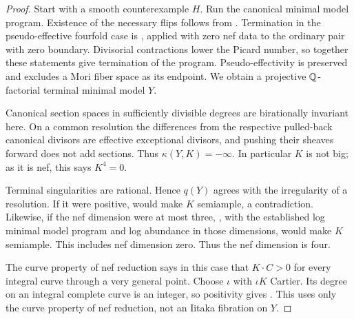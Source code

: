 \begin{proof}
Start with a smooth counterexample $H$.  Run the canonical minimal
model program.  Existence of the necessary flips follows from
\cite[Corollary~1.4.1]{BCHM2010}.  Termination in the pseudo-effective fourfold case is
\cite[Theorem~1.1]{ChenTsakanikas2023}, applied with zero nef data to
the ordinary pair with zero boundary.  Divisorial contractions lower
the Picard number, so together these statements give termination of
the program.  Pseudo-effectivity is preserved and excludes a Mori
fiber space as its endpoint.  We obtain a projective $\mathbb Q$-factorial
terminal minimal model $Y$.

Canonical section spaces in sufficiently divisible degrees are
birationally invariant here.  On a common resolution the differences
from the respective pulled-back canonical divisors are effective
exceptional divisors, and pushing their sheaves forward does not add
sections.  Thus $\kappa(Y,K)=-\infty$.  In particular $K$ is not big;
as it is nef, this says $K^4=0$.

Terminal singularities are rational.  Hence $q(Y)$ agrees with the
irregularity of a resolution.  If it were positive,
\cite[Corollary~4.7]{Fujino2010} would make $K$ semiample, a
contradiction.  Likewise, if the nef dimension were at most three,
\cite[Theorem~4.3]{Ambro2005}, with the established log minimal model
program and log abundance in those dimensions, would make $K$
semiample.  This includes nef dimension zero.  Thus the nef dimension
is four.

The curve property of nef reduction \cite[Theorem~2.1]{BauerEtAl2002} says in this
case that $K\cdot C>0$ for every integral curve through a very general
point.  Choose $\iota$ with $\iota K$ Cartier.  Its degree on an
integral complete curve is an integer, so positivity gives
.  This uses only the curve property of nef
reduction, not an Iitaka fibration on $Y$.
\end{proof}


